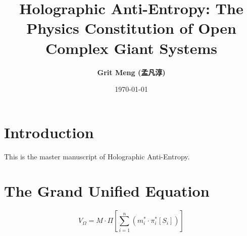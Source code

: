 \documentclass[11pt,a4paper]{article}
\title{\textbf{Holographic Anti-Entropy: The Physics Constitution of Open Complex Giant Systems}}
\author{\textbf{Grit Meng (孟凡淳)}}
\date{\today}
\begin{document}
\maketitle

\section{Introduction}
This is the master manuscript of Holographic Anti-Entropy.

\section{The Grand Unified Equation}
\begin{equation}
V_\Omega = M \cdot \Pi \left[ \sum_{i=1}^n \left( m_i^* \cdot \pi_i^* [S_i] \right) \right]
\end{equation}
\end{document}
